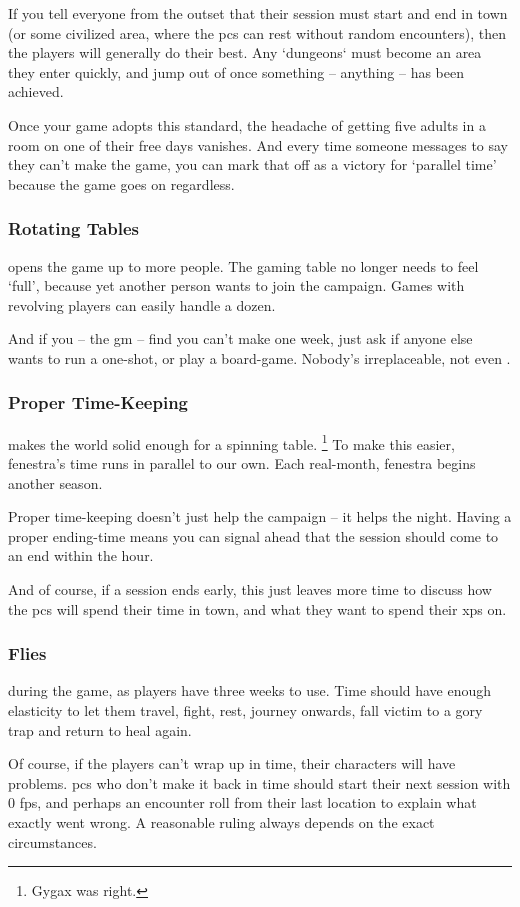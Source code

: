 \begin{multicols}{2}
If you tell everyone from the outset that their session must start and end in town (or some civilized area, where the \glspl{pc} can rest without random encounters), then the players will generally do their best.
Any `dungeons` must become an area they enter quickly, and jump out of once something -- anything -- has been achieved.

Once your game adopts this standard, the headache of getting five adults in a room on one of their free days vanishes.
And every time someone messages to say they can't make the game, you can mark that off as a victory for `parallel time' because the game goes on regardless.

\subsubsection{Rotating Tables}
opens the game up to more people.
The gaming table no longer needs to feel `full', because yet another person wants to join the campaign.
Games with revolving players can easily handle a dozen.

And if you -- the \gls{gm} -- find you can't make one week, just ask if anyone else wants to run a one-shot, or play a board-game.
Nobody's irreplaceable, not even .

\subsubsection{Proper Time-Keeping}
makes the world solid enough for a spinning table.
\footnote{Gygax was right.}
To make this easier, \gls{fenestra}'s time runs in parallel to our own.
Each real-month, \gls{fenestra} begins another season.

Proper time-keeping doesn't just help the \gls{campaign} -- it helps the night.
Having a proper ending-time means you can signal ahead that the session should come to an end within the hour.

And of course, if a session ends early, this just leaves more time to discuss how the \glspl{pc} will spend their time in town, and what they want to spend their \glspl{xp} on.

\subsubsection{ Flies}
during the game, as players have three weeks to use.
Time should have enough elasticity to let them travel, fight, rest, journey onwards, fall victim to a gory trap and return to heal again.

Of course, if the players can't wrap up in time, their characters will have problems.
\Glspl{pc} who don't make it back in time should start their next session with 0 \glspl{fp}, and perhaps an encounter roll from their last location to explain what exactly went wrong.
A reasonable ruling always depends on the exact circumstances.

\end{multicols}

